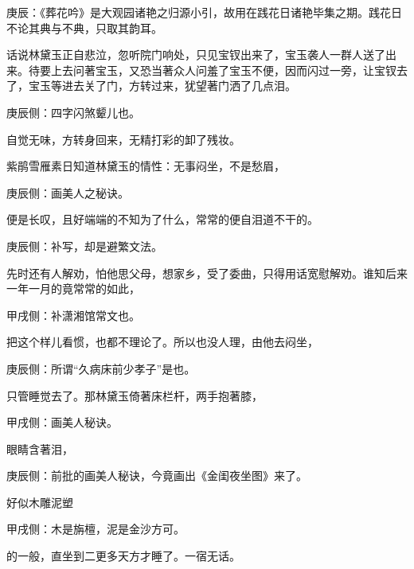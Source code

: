 
\begin{parag}
    \begin{note}庚辰：《葬花吟》是大观园诸艳之归源小引，故用在践花日诸艳毕集之期。践花日不论其典与不典，只取其韵耳。\end{note}
\end{parag}


\begin{parag}
    话说林黛玉正自悲泣，忽听院门响处，只见宝钗出来了，宝玉袭人一群人送了出来。待要上去问著宝玉，又恐当著众人问羞了宝玉不便，因而闪过一旁，让宝钗去了，宝玉等进去关了门，方转过来，犹望著门洒了几点泪。\begin{note}庚辰侧：四字闪煞颦儿也。\end{note}自觉无味，方转身回来，无精打彩的卸了残妆。
\end{parag}


\begin{parag}
    紫鹃雪雁素日知道林黛玉的情性：无事闷坐，不是愁眉，\begin{note}庚辰侧：画美人之秘诀。\end{note}便是长叹，且好端端的不知为了什么，常常的便自泪道不干的。\begin{note}庚辰侧：补写，却是避繁文法。\end{note}先时还有人解劝，怕他思父母，想家乡，受了委曲，只得用话宽慰解劝。谁知后来一年一月的竟常常的如此，\begin{note}甲戌侧：补潇湘馆常文也。\end{note}把这个样儿看惯，也都不理论了。所以也没人理，由他去闷坐，\begin{note}庚辰侧：所谓“久病床前少孝子”是也。\end{note}只管睡觉去了。那林黛玉倚著床栏杆，两手抱著膝，\begin{note}甲戌侧：画美人秘诀。\end{note}眼睛含著泪，\begin{note}庚辰侧：前批的画美人秘诀，今竟画出《金闺夜坐图》来了。\end{note}好似木雕泥塑\begin{note}甲戌侧：木是旃檀，泥是金沙方可。\end{note}的一般，直坐到二更多天方才睡了。一宿无话。
\end{parag}


